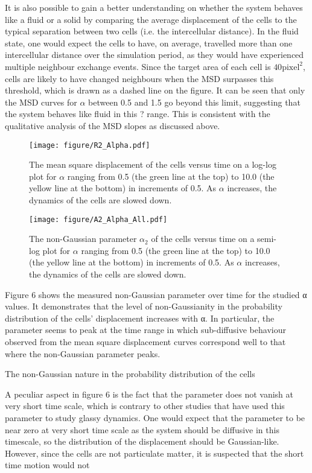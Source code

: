 \documentclass[a4paper,12pt]{article}
\begin{document}
It is also possible to gain a better understanding on whether the system behaves like a fluid or a solid by comparing the average displacement of the cells to the typical separation between two cells (i.e. the intercellular distance). In the fluid state, one would expect the cells to have, on average, travelled more than one intercellular distance over the simulation period, as they would have experienced multiple neighbour exchange events. Since the target area of each cell is $40 \textrm{pixel}^2$, cells are likely to have changed neighbours when the MSD surpasses this threshold, which is drawn as a dashed line on the figure.  It can be seen that only the MSD curves for $\alpha$ between 0.5 and 1.5 go beyond this limit, suggesting that the system behaves like fluid in this ? range. This is consistent with the qualitative analysis of the MSD slopes as discussed above. 
\begin{figure}[H]
\centering
\texttt{[image: figure/R2\_Alpha.pdf]}
\caption{The mean square displacement of the cells versus time on a log-log plot for $\alpha$ ranging from 0.5 (the green line at the top) to 10.0 (the yellow line at the bottom) in increments of 0.5. As $\alpha$ increases, the dynamics of the cells are slowed down.}
\label{fig:r2alpha}
\end{figure}
\begin{figure}[H]
\centering
\texttt{[image: figure/A2\_Alpha\_All.pdf]}
\caption{The non-Gaussian parameter $\alpha_2$ of the cells versus time on a semi-log plot for $\alpha$ ranging from 0.5 (the green line at the top) to 10.0 (the yellow line at the bottom) in increments of 0.5. As $\alpha$ increases, the dynamics of the cells are slowed down.}
\label{fig:r2alpha}
\end{figure}
\FloatBarrier
Figure 6 shows the measured non-Gaussian parameter over time for the studied α values. It demonstrates that the level of non-Gaussianity in the probability distribution of the cells’ displacement increases with α. In particular, the parameter seems to peak at the time range in which sub-diffusive behaviour observed from the mean square displacement curves correspond well to that where the non-Gaussian parameter peaks. 

The non-Gaussian nature in the probability distribution of the cells 

A peculiar aspect in figure 6 is the fact that the parameter does not vanish at very short time scale, which is contrary to other studies that have used this parameter to study glassy dynamics. One would expect that the parameter to be near zero at very short time scale as the system should be diffusive in this timescale, so the distribution of the displacement should be Gaussian-like. However, since the cells are not particulate matter, it is suspected that the short time motion would not 
\end{document}
